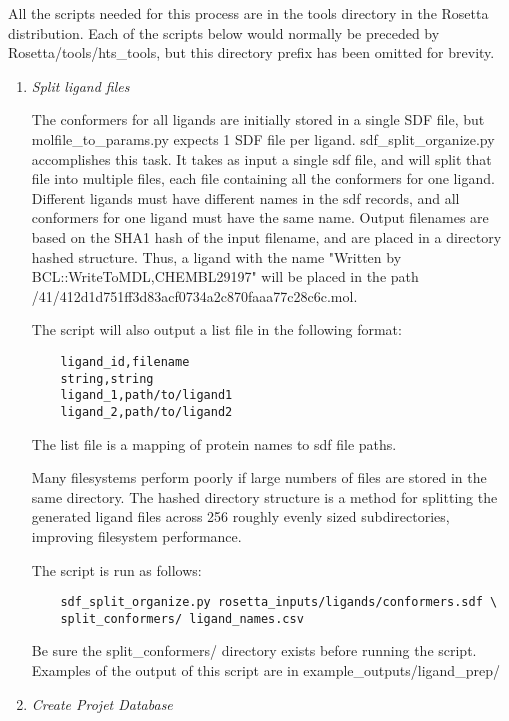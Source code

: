 All the scripts needed for this process are in the tools directory in the Rosetta distribution. 
Each of the scripts below would normally be preceded by Rosetta/tools/hts\_tools, but this directory prefix has been omitted for brevity.

\begin{enumerate}
\def\labelenumi{\arabic{enumi}.}
\item
	\emph{Split ligand files}

	The conformers for all ligands are initially stored in a single SDF file, but molfile\_to\_params.py expects 1 SDF file per ligand.
	sdf\_split\_organize.py accomplishes this task. 
	It takes as input a single sdf file, and will split that file into multiple files, each file containing all the conformers for one ligand.
	Different ligands must have different names in the sdf records, and all conformers for one ligand must have the same name. 
	Output filenames are based on the SHA1 hash of the input filename, and are placed in a directory hashed structure.
	Thus, a ligand with the name "Written by BCL::WriteToMDL,CHEMBL29197" will be placed in the path\\
	 /41/412d1d751ff3d83acf0734a2c870faaa77c28c6c.mol.

	The script will also output a list file in the following format:

	\begin{verbatim}
	ligand_id,filename
	string,string
	ligand_1,path/to/ligand1
	ligand_2,path/to/ligand2
	\end{verbatim}

	The list file is a mapping of protein names to sdf file paths.

	Many filesystems perform poorly if large numbers of files are stored in the same directory.
	The hashed directory structure is a method for splitting the generated ligand files across 256 roughly evenly sized subdirectories, improving filesystem performance.

	The script is run as follows:

	\begin{verbatim}
	sdf_split_organize.py rosetta_inputs/ligands/conformers.sdf \
	split_conformers/ ligand_names.csv
	\end{verbatim}

	Be sure the split\_conformers/ directory exists before running the script.
	Examples of the output of this script are in example\_outputs/ligand\_prep/
\item
	\emph{Create Projet Database}


\end{enumerate}
